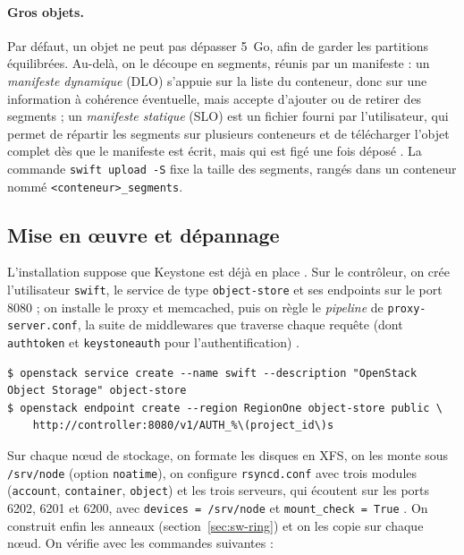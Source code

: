 \paragraph{Gros objets.} Par défaut, un objet ne peut pas dépasser 5~Go, afin de garder les partitions équilibrées. Au-delà,
on le découpe en segments, réunis par un manifeste : un \emph{manifeste dynamique} (DLO) s'appuie sur la liste du conteneur,
donc sur une information à cohérence éventuelle, mais accepte d'ajouter ou de retirer des segments ; un \emph{manifeste
statique} (SLO) est un fichier fourni par l'utilisateur, qui permet de répartir les segments sur plusieurs conteneurs et de
télécharger l'objet complet dès que le manifeste est écrit, mais qui est figé une fois déposé \parencite{swift-large-objects}.
La commande \texttt{swift upload -S} fixe la taille des segments, rangés dans un conteneur nommé \texttt{<conteneur>\_segments}.

\subsection{Mise en œuvre et dépannage}\label{sec:sw-deploiement}

L'installation suppose que Keystone est déjà en place \parencite{swift-install}. Sur le contrôleur, on crée l'utilisateur
\texttt{swift}, le service de type \texttt{object-store} et ses endpoints sur le port 8080 ; on installe le proxy et
memcached, puis on règle le \emph{pipeline} de \texttt{proxy-server.conf}, la suite de middlewares que traverse chaque
requête (dont \texttt{authtoken} et \texttt{keystoneauth} pour l'authentification) \parencite{swift-install-controller}.

\par\noindent\begin{minipage}{\linewidth}
\begin{lstlisting}[style=terminal]
$ openstack service create --name swift --description "OpenStack Object Storage" object-store
$ openstack endpoint create --region RegionOne object-store public \
    http://controller:8080/v1/AUTH_%\(project_id\)s
\end{lstlisting}
\end{minipage}\par

Sur chaque nœud de stockage, on formate les disques en XFS, on les monte sous \texttt{/srv/node} (option \texttt{noatime}),
on configure \texttt{rsyncd.conf} avec trois modules (\texttt{account}, \texttt{container}, \texttt{object}) et les trois
serveurs, qui écoutent sur les ports 6202, 6201 et 6200, avec \texttt{devices = /srv/node} et \texttt{mount\_check = True}
\parencite{swift-install-storage}. On construit enfin les anneaux (section~\ref{sec:sw-ring}) et on les copie sur chaque nœud.
On vérifie avec les commandes suivantes \parencite{swift-verify} :

